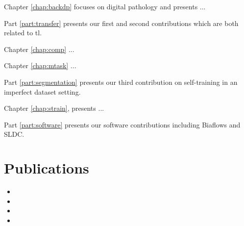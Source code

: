 Chapter \ref{chap:backdp} focuses on digital pathology and presents ...

Part \ref{part:transfer} presents our first and second contributions which are both related to \acrlong{tl}. 

Chapter \ref{chap:comp} ...

Chapter \ref{chap:mtask} ...

Part \ref{part:segmentation} presents our third contribution on self-training in an imperfect dataset setting. 

Chapter \ref{chap:strain}, presents ...

Part \ref{part:software} presents our software contributions including Biaflows and SLDC.

\section{Publications}

\begin{itemize}
  \item {}
  \item {}
  \item {}
  \item {}
\end{itemize}


